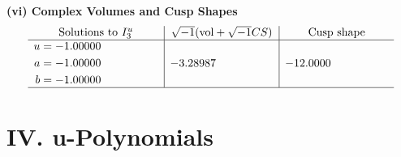 \documentclass[1p]{elsarticle_modified}
\theoremstyle{definition}
\newcommand{\I}{\sqrt{-1}}
\begin{document}
\newpage\flushleft \textbf{(vi) Complex Volumes and Cusp Shapes}
$$\begin{array}{c|c|c}  
\text{Solutions to }I^u_{3}& \I (\text{vol} + \sqrt{-1}CS) & \text{Cusp shape}\\
 \hline 
\begin{aligned}
u &= -1.00000\phantom{ +0.000000I} \\
a &= -1.00000\phantom{ +0.000000I} \\
b &= -1.00000\phantom{ +0.000000I}\end{aligned}
 & -3.28987\phantom{ +0.000000I} & -12.0000\phantom{ +0.000000I}\\
 \hline 
 \end{array}$$\newpage
\newpage\renewcommand{\arraystretch}{1}
\centering \section*{ IV. u-Polynomials}
\end{document}

